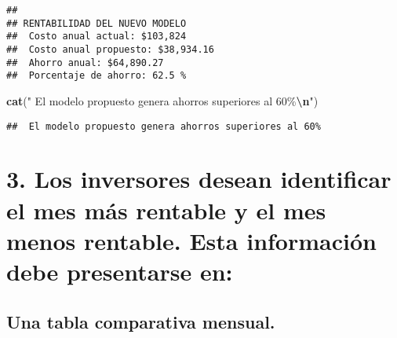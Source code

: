 \documentclass[
]{article}
\newenvironment{Shaded}{\begin{snugshade}}{\end{snugshade}}
\newcommand{\AttributeTok}[1]{\textcolor[rgb]{0.13,0.29,0.53}{#1}}
\newcommand{\DecValTok}[1]{\textcolor[rgb]{0.00,0.00,0.81}{#1}}
\newcommand{\FunctionTok}[1]{\textcolor[rgb]{0.13,0.29,0.53}{\textbf{#1}}}
\newcommand{\NormalTok}[1]{#1}
\newcommand{\OtherTok}[1]{\textcolor[rgb]{0.56,0.35,0.01}{#1}}
\newcommand{\SpecialCharTok}[1]{\textcolor[rgb]{0.81,0.36,0.00}{\textbf{#1}}}
\newcommand{\StringTok}[1]{\textcolor[rgb]{0.31,0.60,0.02}{#1}}
\begin{document}
\begin{verbatim}
## 
## RENTABILIDAD DEL NUEVO MODELO
##  Costo anual actual: $103,824 
##  Costo anual propuesto: $38,934.16 
##  Ahorro anual: $64,890.27 
##  Porcentaje de ahorro: 62.5 %
\end{verbatim}

\begin{Shaded}
\begin{Highlighting}[]
\FunctionTok{cat}\NormalTok{(}\StringTok{" El modelo propuesto genera ahorros superiores al 60\%}\SpecialCharTok{\textbackslash{}n}\StringTok{"}\NormalTok{)}
\end{Highlighting}
\end{Shaded}

\begin{verbatim}
##  El modelo propuesto genera ahorros superiores al 60%
\end{verbatim}

\section{3. Los inversores desean identificar el mes más rentable y el
mes menos rentable. Esta información debe presentarse
en:}\label{los-inversores-desean-identificar-el-mes-muxe1s-rentable-y-el-mes-menos-rentable.-esta-informaciuxf3n-debe-presentarse-en}

\subsection{Una tabla comparativa
mensual.}\label{una-tabla-comparativa-mensual.}

\begin{Shaded}
\end{Shaded}
\end{document}
